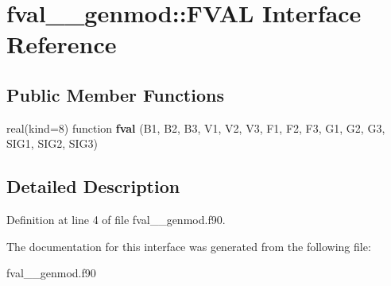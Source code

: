 \hypertarget{interfacefval____genmod_1_1_f_v_a_l}{\section{fval\+\_\+\+\_\+genmod\+:\+:F\+V\+A\+L Interface Reference}
\label{interfacefval____genmod_1_1_f_v_a_l}
}
\subsection*{Public Member Functions}
\begin{DoxyCompactItemize}
\item 
\hypertarget{interfacefval____genmod_1_1_f_v_a_l_a0dea7b37fd01b8cdb4161c0d35c4563e}{real(kind=8) function {\bfseries fval} (B1, B2, B3, V1, V2, V3, F1, F2, F3, G1, G2, G3, S\+I\+G1, S\+I\+G2, S\+I\+G3)}\label{interfacefval____genmod_1_1_f_v_a_l_a0dea7b37fd01b8cdb4161c0d35c4563e}

\end{DoxyCompactItemize}


\subsection{Detailed Description}


Definition at line 4 of file fval\+\_\+\+\_\+genmod.\+f90.



The documentation for this interface was generated from the following file\+:\begin{DoxyCompactItemize}
\item 
fval\+\_\+\+\_\+genmod.\+f90\end{DoxyCompactItemize}
